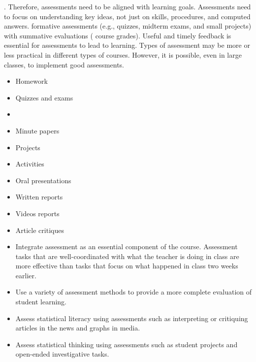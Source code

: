 .
Therefore, assessments need to be aligned with learning goals.
Assessments need to focus on  understanding key ideas, not just on skills, procedures, and computed answers.  formative assessments (e.g., quizzes, midterm exams, and small projects)  with summative evaluations ( course grades). Useful and timely feedback is essential for assessments to lead to learning.  Types of assessment may be more or less practical in different types of courses.
However, it is possible, even in large classes, to implement good assessments. \\

\vspace{.2in}

\noindent{}
\begin{itemize}[leftmargin=1cm, itemsep=.2em]
\item Homework
\item {} Quizzes and exams
\item {}
\item Minute papers
\item Projects
\item Activities
\item Oral presentations
\item Written reports
\item Videos reports
\item Article critiques
\end{itemize}

 \vspace{.2in}
\noindent{}

\renewcommand{\labelitemi}{$\checkmark$}

\begin{itemize}[leftmargin=1cm, itemsep=.2em]
\item Integrate assessment as an essential component of the course. Assessment tasks that are well-coordinated with what the teacher is doing in class are more effective than tasks that focus on what happened in class two weeks earlier.
\item Use a variety of assessment methods to provide a more complete evaluation of student learning.
\item Assess statistical literacy using assessments such as interpreting or critiquing articles in the news and graphs in media.
\item Assess statistical thinking using assessments such as student projects and open-ended investigative tasks.
\end{itemize}
 
